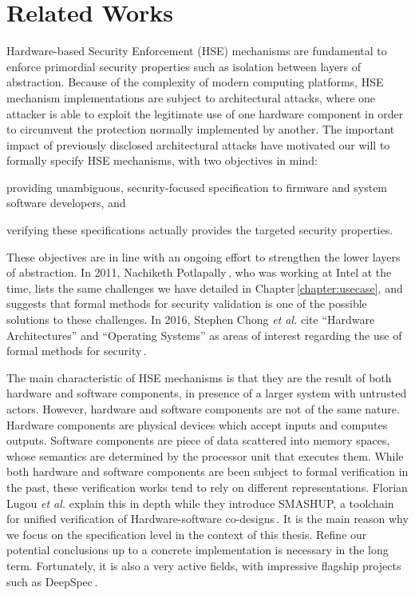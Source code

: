 \chapter{Related Works}
\label{chapter:relatedwork}

Hardware-based Security Enforcement (HSE) mechanisms are fundamental to enforce
primordial security properties such as isolation between layers of abstraction.
%
Because of the complexity of modern computing platforms, HSE mechanism
implementations are subject to architectural attacks, where one attacker is able
to exploit the legitimate use of one hardware component in order to circumvent
the protection normally implemented by another.
%
The important impact of previously disclosed architectural attacks have
motivated our will to formally specify HSE mechanisms, with two objectives in
mind:
%
\begin{inparaenum}[(1)]
\item providing unambiguous, security-focused specification to firmware and
  system software developers, and
%
\item verifying these specifications actually provides the targeted security
  properties.
\end{inparaenum}
%
These objectives are in line with an ongoing effort to strengthen the lower
layers of abstraction.
%
In 2011, Nachiketh Potlapally\,\cite{potlapally2011hardwaresecurity}, who
was working at Intel at the time, lists the same challenges we have detailed in
Chapter\,\ref{chapter:usecase}, and suggests that formal methods for security
validation is one of the possible solutions to these challenges.
%
In 2016, Stephen Chong \emph{et al.} cite ``Hardware Architectures'' and
``Operating Systems'' as areas of interest regarding the use of formal methods
for security\,\cite{chong2016report}.

The main characteristic of HSE mechanisms is that they are the result of both
hardware and software components, in presence of a larger system with untrusted
actors.
%
However, hardware and software components are not of the same nature.
%
Hardware components are physical devices which accept inputs and computes
outputs.
%
Software components are piece of data scattered into memory spaces, whose
semantics are determined by the processor unit that executes them.
%
While both hardware and software components are been subject to formal
verification in the past, these verification works tend to rely on different
representations.
%
Florian Lugou \emph{et al.} explain this in depth while they introduce SMASHUP,
a toolchain for unified verification of Hardware-software
co-designs\,\cite{lugou2017smashup}.
%
It is the main reason why we focus on the specification level in the context of
this thesis.
%
Refine our potential conclusions up to a concrete implementation is necessary in
the long term.
%
Fortunately, it is also a very active fields, with impressive flagship projects
such as DeepSpec\,\cite{appel2017deepspec}.

